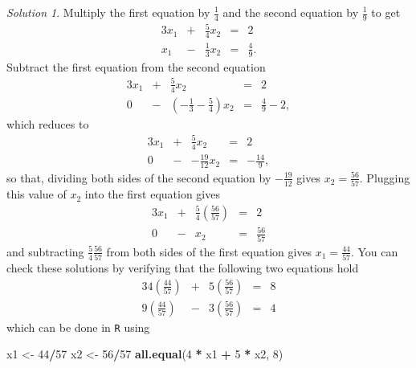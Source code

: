 \documentclass[
]{book}
\newenvironment{Shaded}{\begin{snugshade}}{\end{snugshade}}
\newcommand{\DecValTok}[1]{\textcolor[rgb]{0.00,0.00,0.81}{#1}}
\newcommand{\KeywordTok}[1]{\textcolor[rgb]{0.13,0.29,0.53}{\textbf{#1}}}
\newcommand{\NormalTok}[1]{#1}
\newcommand{\OperatorTok}[1]{\textcolor[rgb]{0.81,0.36,0.00}{\textbf{#1}}}
\newcommand{\StringTok}[1]{\textcolor[rgb]{0.31,0.60,0.02}{#1}}
\theoremstyle{definition}
\theoremstyle{definition}
\theoremstyle{definition}
\theoremstyle{definition}
\theoremstyle{remark}
\newtheorem*{solution}{Solution}
\begin{document}
\begin{solution}

Multiply the first equation by \(\frac{1}{4}\) and the second equation by \(\frac{1}{9}\) to get
\begin{alignat*}{3}
x_1 & {}+{} & \frac{5}{4} x_2 & {}={} & 2 \\
x_1 & {}-{} &  \frac{1}{3}x_2 & {}={} & \frac{4}{9}.
\end{alignat*}
Subtract the first equation from the second equation
\begin{alignat*}{3}
x_1 & {}+{} & \frac{5}{4} x_2 & {}={} & 2 \\
0 & {}-{} &  (-\frac{1}{3} - \frac{5}{4}) x_2 & {}={} & \frac{4}{9} - 2,
\end{alignat*}
which reduces to
\begin{alignat*}{3}
x_1 & {}+{} & \frac{5}{4} x_2 & {}={} & 2 \\
0 & {}-{} &  -\frac{19}{12} x_2 & {}={} & -\frac{14}{9},
\end{alignat*}
so that, dividing both sides of the second equation by \(-\frac{19}{12}\) gives \(x_2 = \frac{56}{57}\). Plugging this value of \(x_2\) into the first equation gives
\begin{alignat*}{3}
x_1 & {}+{} & \frac{5}{4} \left(\frac{56}{57}\right) & {}={} & 2 \\
0 & {}-{} &   x_2 & {}={} & \frac{56}{57}
\end{alignat*}
and subtracting \(\frac{5}{4} \frac{56}{57}\) from both sides of the first equation gives \(x_1 = \frac{44}{57}\). You can check these solutions by verifying that the following two equations hold
\begin{alignat*}{3}
4 \left(\frac{44}{57}\right) & {}+{} & 5  \left(\frac{56}{57}\right) & {}={} & 8 \\
9 \left(\frac{44}{57}\right) & {}-{} & 3 \left(\frac{56}{57}\right)& {}={} & 4
\end{alignat*}
which can be done in \texttt{R} using

\begin{Shaded}
\begin{Highlighting}[]
\NormalTok{x1 <-}\StringTok{ }\DecValTok{44}\OperatorTok{/}\DecValTok{57}
\NormalTok{x2 <-}\StringTok{ }\DecValTok{56}\OperatorTok{/}\DecValTok{57}
\KeywordTok{all.equal}\NormalTok{(}\DecValTok{4} \OperatorTok{*}\StringTok{ }\NormalTok{x1 }\OperatorTok{+}\StringTok{ }\DecValTok{5} \OperatorTok{*}\StringTok{ }\NormalTok{x2, }\DecValTok{8}\NormalTok{)}
\end{Highlighting}
\end{Shaded}


\end{solution}
\end{document}
